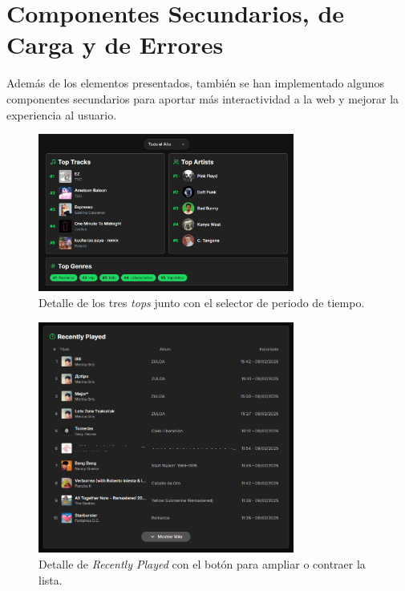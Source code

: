 \section{Componentes Secundarios, de Carga y de Errores}

Además de los elementos presentados, también se han implementado algunos componentes secundarios para aportar más interactividad a la web y mejorar la experiencia al usuario.

\begin{figure}[H]
    \centering
    \includegraphics[width=0.75\textwidth]{figures/capturas_ui/tops_detalle.png}
    \caption{Detalle de los tres \textit{tops} junto con el selector de periodo de tiempo.}
    \label{fig:tops_detalle}
\end{figure}

\begin{figure}[H]
    \centering
    \vspace{-10pt}
    \includegraphics[width=0.75\textwidth]{figures/capturas_ui/recently_played.png}
    \caption{Detalle de \textit{Recently Played} con el botón para ampliar o contraer la lista.}
    \label{fig:recently_played}
\end{figure}

